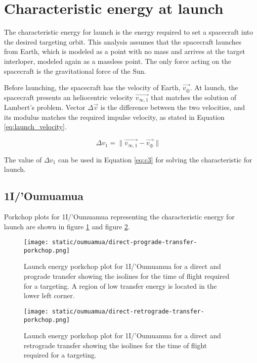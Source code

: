 \section{Characteristic energy at launch}

The characteristic energy for launch is the energy required to set a spacecraft
into the desired targeting orbit. This analysis assumes that the spacecraft
launches from Earth, which is modeled as a point with no mass and arrives at the
target interloper, modeled again as a massless point. The only force acting on
the spacecraft is the gravitational force of the Sun.

Before launching, the spacecraft has the velocity of Earth, $\vec{v_{\oplus}}$.
At launch, the spacecraft presents an heliocentric velocity $\vec{v_{\infty
        ,1}}$ that matches the solution of Lambert's problem. Vector $\Delta{\vec{v}}$
is the difference between the two velocities, and its modulus matches the
required impulse velocity, as stated in Equation \ref{eq:launch_velocity}.

\begin{equation}
  \Delta v_1 = \|\vec{v_{\infty ,1}} - \vec{v_{\oplus}}\|
  \label{eq:launch_velocity}
\end{equation}

The value of $\Delta v_1$ can be used in Equation \ref{eq:c3} for solving the
characteristic for launch.

\subsection{1I/'Oumuamua}

Porkchop plots for 1I/'Oumuamua representing the characteristic energy for launch
are shown in figure \ref{fig:oumuamua-direct-prograde-transfer-porkchop} and
figure \ref{fig:oumuamua-direct-retrograde-transfer-porkchop}.

\begin{figure}[H]
  \centering
  \texttt{[image: static/oumuamua/direct-prograde-transfer-porkchop.png]}
  \caption[Direct and prograde launch energy porkchop for 'Oumuamua]{Launch energy porkchop plot for 1I/'Oumuamua for a direct and prograde
    transfer showing the isolines for
    the time of flight required for a targeting. A region of low transfer
    energy is located in the lower left corner.}
  \label{fig:oumuamua-direct-prograde-transfer-porkchop}
\end{figure}

\begin{figure}[H]
  \centering
  \texttt{[image: static/oumuamua/direct-retrograde-transfer-porkchop.png]}
  \caption[Direct and retrograde launch energy porkchop for
    'Oumuamua]{Launch energy porkchop plot for 1I/'Oumuamua for a direct and
    retrograde transfer showing the isolines for
    the time of flight required for a targeting.}
  \label{fig:oumuamua-direct-retrograde-transfer-porkchop}
\end{figure}

